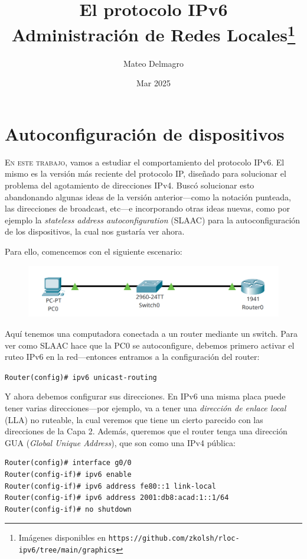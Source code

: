 \documentclass[a4paper,10pt]{corsage}
\title{\Huge{}El protocolo IPv6\\\large{}Administración de Redes Locales\footnote{Imágenes disponibles en \texttt{https://github.com/zkolsh/rloc-ipv6/tree/main/graphics}}}
\author{Mateo Delmagro}
\date{Mar 2025}
\makeatletter
\newcommand{\devname}[1]{\textsc{#1}}
\newcommand*{\@doendeq}{%
	\everypar{{\setbox\z@\lastbox}\everypar{}}%
}
\newenvironment{console}{%
	\begin{tcolorbox}[
		left skip=1cm,
		right skip=1Cm,
		left=8pt,
		right=8pt,
		top=2.5\parskip,
		bottom=2\parskip,
		colback=gray!10,
		colframe=gray!40,
		boxrule=0pt,
		leftrule=4pt,
		sharp corners=all,
		fontupper=\ttfamily\flushleft\footnotesize
	]%
}{%
	\end{tcolorbox}%
	\ignorespacesafterend\par\noindent\aftergroup\@doendeq%
}
\makeatother
\begin{document}
\maketitle
\cleardoublepage

\newcommand{\scenarioheight}{5\baselineskip}
\chapter{Autoconfiguración de dispositivos}
	\lettrine{E}{n este trabajo}, vamos a estudiar el comportamiento del protocolo IPv6.  El mismo es la versión más reciente del protocolo IP, diseñado para solucionar el problema del agotamiento de direcciones IPv4.  Buscó solucionar esto abandonando algunas ideas de la versión anterior---como la notación punteada, las direcciones de broadcast, etc---e incorporando otras ideas nuevas, como por ejemplo la \textit{stateless address autoconfiguration} (SLAAC) para la autoconfiguración de los dispositivos, la cual nos gustaría ver ahora.

	Para ello, comencemos con el siguiente escenario:
	\begin{figure}[h]
		\centering
		\includegraphics[height=\scenarioheight]{slaac-quiet}
	\end{figure}

	Aquí tenemos una computadora conectada a un router mediante un switch.  Para ver como SLAAC hace que la \devname{PC0} se autoconfigure, debemos primero activar el ruteo IPv6 en la red---entonces entramos a la configuración del router:
	\begin{console}
		\verb|Router(config)# ipv6 unicast-routing|
	\end{console}

	Y ahora debemos configurar sus direcciones.  En IPv6 una misma placa puede tener varias direcciones---por ejemplo, va a tener una \textit{dirección de enlace local} (LLA) no ruteable, la cual veremos que tiene un cierto parecido con las direcciones de la Capa 2.  Además, queremos que el router tenga una dirección GUA (\textit{Global Unique Address}), que son como una IPv4 pública:
	\begin{console}
		\begin{verbatim}Router(config)# interface g0/0
Router(config-if)# ipv6 enable
Router(config-if)# ipv6 address fe80::1 link-local
Router(config-if)# ipv6 address 2001:db8:acad:1::1/64
Router(config-if)# no shutdown\end{verbatim}
	\end{console}
\end{document}
